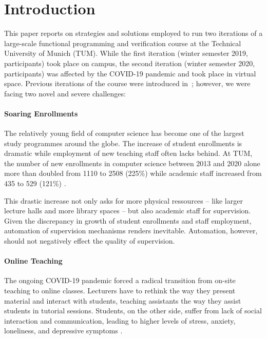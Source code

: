 \section{Introduction}

This paper reports on strategies and solutions employed to
run two iterations of a large-scale functional programming and verification course at the Technical University of Munich (TUM).
While the first iteration (winter semester 2019,  participants)
took place on campus,
the second iteration (winter semester 2020,  participants) was affected by the COVID-19 pandemic and took place in virtual space.
Previous iterations of the course were introduced in~\citep{next_1100};
however, we were facing two novel and severe challenges:

\paragraph{Soaring Enrollments}
The relatively young field of computer science has
become one of the largest study programmes around the globe.
The increase of student enrollments is dramatic
\citep{comp_sci_growth1,comp_sci_growth2}
while employment of new teaching staff often lacks behind.
At TUM, the number of new enrollments in computer science between 2013 and 2020 alone
more than doubled from 1110 to 2508 (225\%)
while academic staff increased from 435 to 529 (121\%) \citep{tum_numbers}.

This drastic increase not only asks for more physical ressources -- like larger lecture halls and more library spaces --
but also academic staff for supervision.
Given the discrepancy in growth of student enrollments and staff employment,
automation of supervision mechanisms renders inevitable.
Automation, however, should not
negatively effect the quality of supervision.

\paragraph{Online Teaching}
The ongoing COVID-19 pandemic forced a radical
transition from on-site teaching to online classes.
Lecturers have to rethink the way they present material and interact with students,
teaching assistants the way they assist students in tutorial sessions.
Students, on the other side, suffer from lack of social interaction and communication, leading to higher
levels of stress, anxiety, loneliness, and depressive symptoms \citep{students_lockdown1}.

